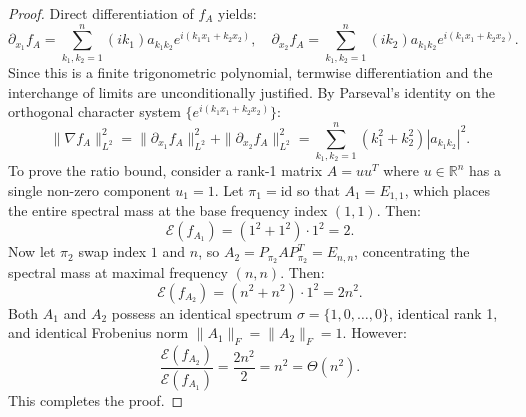 \documentclass[11pt,a4paper,reqno]{amsart}
\theoremstyle{definition}
\numberwithin{equation}{section}
\providecommand{\R}{\mathbb{R}}
\begin{document}
\begin{proof}
Direct differentiation of $f_A$ yields:
\begin{equation}
    \partial_{x_1} f_A = \sum_{k_1, k_2=1}^n (i k_1) a_{k_1 k_2} e^{i(k_1 x_1 + k_2 x_2)}, \quad
    \partial_{x_2} f_A = \sum_{k_1, k_2=1}^n (i k_2) a_{k_1 k_2} e^{i(k_1 x_1 + k_2 x_2)}.
\end{equation}
Since this is a finite trigonometric polynomial, termwise differentiation and the interchange of limits are unconditionally justified. By Parseval's identity on the orthogonal character system $\{e^{i(k_1 x_1 + k_2 x_2)}\}$:
\begin{equation}
    \|\nabla f_A\|_{L^2}^2 = \|\partial_{x_1} f_A\|_{L^2}^2 + \|\partial_{x_2} f_A\|_{L^2}^2 = \sum_{k_1, k_2=1}^n (k_1^2 + k_2^2) |a_{k_1 k_2}|^2.
\end{equation}
To prove the ratio bound, consider a rank-1 matrix $A = u u^T$ where $u \in \R^n$ has a single non-zero component $u_1 = 1$. Let $\pi_1 = \mathrm{id}$ so that $A_1 = E_{1,1}$, which places the entire spectral mass at the base frequency index $(1, 1)$. Then:
\begin{equation}
    \mathcal{E}(f_{A_1}) = (1^2 + 1^2) \cdot 1^2 = 2.
\end{equation}
Now let $\pi_2$ swap index $1$ and $n$, so $A_2 = P_{\pi_2} A P_{\pi_2}^T = E_{n, n}$, concentrating the spectral mass at maximal frequency $(n, n)$. Then:
\begin{equation}
    \mathcal{E}(f_{A_2}) = (n^2 + n^2) \cdot 1^2 = 2n^2.
\end{equation}
Both $A_1$ and $A_2$ possess an identical spectrum $\sigma = \{1, 0, \dots, 0\}$, identical rank 1, and identical Frobenius norm $\|A_1\|_F = \|A_2\|_F = 1$. However:
\begin{equation}
    \frac{\mathcal{E}(f_{A_2})}{\mathcal{E}(f_{A_1})} = \frac{2n^2}{2} = n^2 = \Theta(n^2).
\end{equation}
This completes the proof.
\end{proof}
\end{document}
